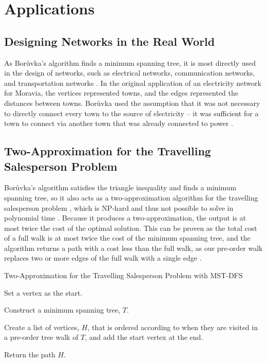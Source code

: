 \documentclass[a4paper, 11pt]{article}
\begin{document}
\section{Applications}

\subsection{Designing Networks in the Real World}
As Borůvka's algorithm finds a minimum spanning tree, it is most directly used in the design of networks, such as electrical networks, communication networks, and transportation networks \cite{graham1985history}. In the original application of an electricity network for Moravia, the vertices represented towns, and the edges represented the distances between towns. Borůvka used the assumption that it was not necessary to directly connect every town to the source of electricity -- it was sufficient for a town to connect via another town that was already connected to power \cite{nevsetvril2001otakar}.

\subsection{Two-Approximation for the Travelling Salesperson Problem}
Borůvka's algorithm satisfies the triangle inequality and finds a minimum spanning tree, so it also acts as a two-approximation algorithm for the travelling salesperson problem \cite{andreae1995performance}, which is NP-hard and thus not possible to solve in polynomial time \cite{junger1995traveling}. Because it produces a two-approximation, the output is at most twice the cost of the optimal solution. This can be proven as the total cost of a full walk is at most twice the cost of the minimum spanning tree, and the algorithm returns a path with a cost less than the full walk, as our pre-order walk replaces two or more edges of the full walk with a single edge \cite{andreae1995performance}.

\begin{algorithm}
    \caption{Two-Approximation for the Travelling Salesperson Problem with MST-DFS \cite{andreae1995performance}}
    \nl Set a vertex as the start.
    
    \nl Construct a minimum spanning tree, $T$.
    
    \nl Create a list of vertices, $H$, that is ordered according to when they are visited in a pre-order tree walk of $T$, and add the start vertex at the end.
    
    \nl Return the path $H$.
\end{algorithm}
\end{document}
